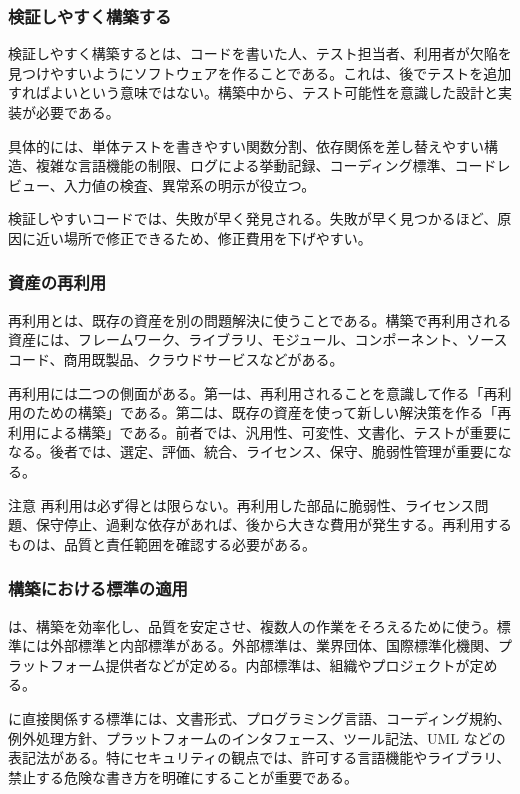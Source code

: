 \documentclass[a4paper,11pt]{ltjsarticle}
\numberwithin{figure}{section}
\numberwithin{table}{section}
\begin{document}
\subsubsection{検証しやすく構築する}

検証しやすく構築するとは、コードを書いた人、テスト担当者、利用者が欠陥を見つけやすいようにソフトウェアを作ることである。これは、後でテストを追加すればよいという意味ではない。構築中から、テスト可能性を意識した設計と実装が必要である。

具体的には、単体テストを書きやすい関数分割、依存関係を差し替えやすい構造、複雑な言語機能の制限、ログによる挙動記録、コーディング標準、コードレビュー、入力値の検査、異常系の明示が役立つ。

検証しやすいコードでは、失敗が早く発見される。失敗が早く見つかるほど、原因に近い場所で修正できるため、修正費用を下げやすい。

\subsubsection{資産の再利用}

再利用とは、既存の資産を別の問題解決に使うことである。構築で再利用される資産には、フレームワーク、ライブラリ、モジュール、コンポーネント、ソースコード、商用既製品、クラウドサービスなどがある。

再利用には二つの側面がある。第一は、再利用されることを意識して作る「再利用のための構築」である。第二は、既存の資産を使って新しい解決策を作る「再利用による構築」である。前者では、汎用性、可変性、文書化、テストが重要になる。後者では、選定、評価、統合、ライセンス、保守、脆弱性管理が重要になる。

\begin{keybox}{注意}
再利用は必ず得とは限らない。再利用した部品に脆弱性、ライセンス問題、保守停止、過剰な依存があれば、後から大きな費用が発生する。再利用するものは、品質と責任範囲を確認する必要がある。
\end{keybox}

\subsubsection{構築における標準の適用}

は、構築を効率化し、品質を安定させ、複数人の作業をそろえるために使う。標準には外部標準と内部標準がある。外部標準は、業界団体、国際標準化機関、プラットフォーム提供者などが定める。内部標準は、組織やプロジェクトが定める。

に直接関係する標準には、文書形式、プログラミング言語、コーディング規約、例外処理方針、プラットフォームのインタフェース、ツール記法、UML などの表記法がある。特にセキュリティの観点では、許可する言語機能やライブラリ、禁止する危険な書き方を明確にすることが重要である。
\end{document}
